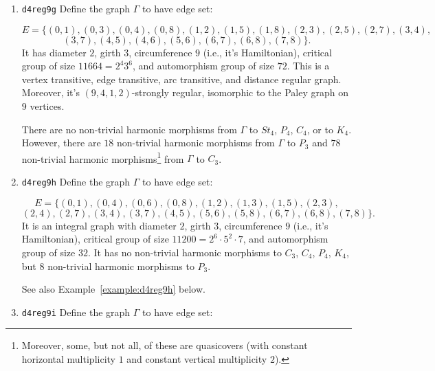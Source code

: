 \documentclass[12pt,letterpaper]{article}
\theoremstyle{definition}
\begin{document}
\begin{enumerate}
There are no non-trivial harmonic morphisms from $\Gamma$ to $St_4$,
$P_3$, $P_4$, $C_4$, or to $K_4$. However,
there are $6$ non-trivial harmonic morphisms from $\Gamma$ to $C_3$.

\item
{\tt d4reg9g}\newline    
  Define the graph $\Gamma$
  to have edge set:

\[
E = \{
(0, 1), (0, 3), (0, 4), (0, 8), (1, 2), (1, 5), (1, 8), (2, 3), (2, 5), (2, 7), (3, 4),
\]
\[
 (3, 7), (4, 5), (4, 6), (5, 6), (6, 7), (6, 8), (7, 8)
\}.
\]
It has diameter $2$,
girth $3$, circumference $9$ (i.e., it's Hamiltonian),
critical group of size $11664 = 2^4 3^6$, 
and automorphism group of size $72$.
This is a vertex transitive, edge transitive, arc transitive,
and distance regular graph.
Moreover, it's $(9,4,1,2)$-strongly regular, isomorphic to the Paley graph
on $9$ vertices.

There are no non-trivial harmonic morphisms from $\Gamma$ to $St_4$,
$P_4$, $C_4$, or to $K_4$. However, there are $18$ non-trivial
harmonic morphisms from $\Gamma$ to $P_3$
and $78$ non-trivial harmonic
morphisms\footnote{Moreover,
  some, but not all, of these are quasicovers
  (with constant horizontal multiplicity $1$ and constant vertical
  multiplicity $2$).} from $\Gamma$ to $C_3$.
\label{page:paley9}

\item
{\tt d4reg9h}\newline    
  Define the graph $\Gamma$ 
to have edge set:

\[
E = \{
(0, 1), (0, 4), (0, 6), (0, 8), (1, 2), (1, 3), (1, 5), (2, 3),
\]
\[
(2, 4), (2, 7), (3, 4), (3, 7), (4, 5), (5, 6), (5, 8), (6, 7), (6, 8), (7, 8)
\}.
\]
It is an integral graph with diameter $2$,
girth $3$, circumference $9$ (i.e., it's Hamiltonian),
critical group of size $11200 = 2^6\cdot 5^2\cdot 7$, 
and automorphism group of size $32$.
It has no non-trivial harmonic morphisms to 
$C_3$, $C_4$, $P_4$, $K_4$, but $8$ non-trivial harmonic morphisms to
$P_3$.

See also Example~\ref{example:d4reg9h} below.
  
\item
{\tt d4reg9i}\newline  
  Define the graph $\Gamma$
  to have edge set:


\end{enumerate}
\end{document}
